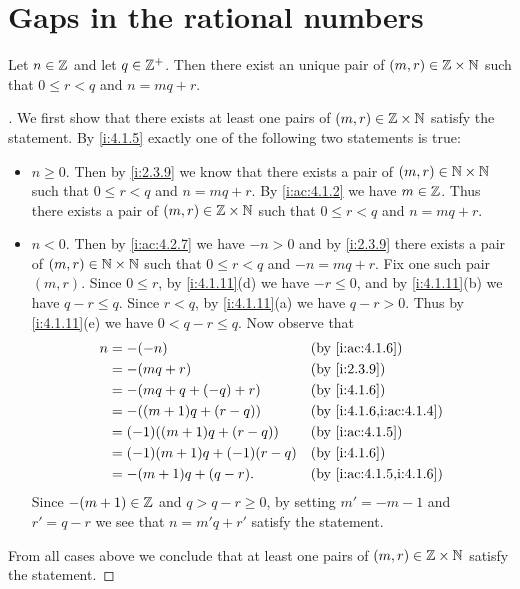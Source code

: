 \section{Gaps in the rational numbers}\label{i:sec:4.4}

\begin{ac}\label{i:ac:4.4.1}
  Let \(n \in \mathbb{Z}\) and let \(q \in \mathbb{Z}^+\).
  Then there exist an unique pair of \((m, r) \in \mathbb{Z} \times \mathbb{N}\) such that \(0 \leq r < q\) and \(n = mq + r\).
\end{ac}

\begin{proof}[]
  We first show that there exists at least one pairs of \((m, r) \in \mathbb{Z} \times \mathbb{N}\) satisfy the statement.
  By \cref{i:4.1.5} exactly one of the following two statements is true:
  \begin{itemize}
    \item \(n \geq 0\).
          Then by \cref{i:2.3.9} we know that there exists a pair of \((m, r) \in \mathbb{N} \times \mathbb{N}\) such that \(0 \leq r < q\) and \(n = mq + r\).
          By \cref{i:ac:4.1.2} we have \(m \in \mathbb{Z}\).
          Thus there exists a pair of \((m, r) \in \mathbb{Z} \times \mathbb{N}\) such that \(0 \leq r < q\) and \(n = mq + r\).
    \item \(n < 0\).
          Then by \cref{i:ac:4.2.7} we have \(-n > 0\) and by \cref{i:2.3.9} there exists a pair of \((m, r) \in \mathbb{N} \times \mathbb{N}\) such that \(0 \leq r < q\) and \(-n = mq + r\).
          Fix one such pair \((m, r)\).
          Since \(0 \leq r\), by \cref{i:4.1.11}(d) we have \(-r \leq 0\), and by \cref{i:4.1.11}(b) we have \(q - r \leq q\).
          Since \(r < q\), by \cref{i:4.1.11}(a) we have \(q - r > 0\).
          Thus by \cref{i:4.1.11}(e) we have \(0 < q - r \leq q\).
          Now observe that
          \begin{align*}
            n & = -(-n)                         &  & \by{i:ac:4.1.6}         \\
              & = -(mq + r)                     &  & \by{i:2.3.9}            \\
              & = -(mq + q + (-q) + r)          &  & \by{i:4.1.6}            \\
              & = -((m + 1) q + (r - q))        &  & \by{i:4.1.6,i:ac:4.1.4} \\
              & = (-1) ((m + 1) q + (r - q))    &  & \by{i:ac:4.1.5}         \\
              & = (-1) (m + 1) q + (-1) (r - q) &  & \by{i:4.1.6}            \\
              & = -(m + 1) q + (q - r).         &  & \by{i:ac:4.1.5,i:4.1.6}
          \end{align*}
          Since \(-(m + 1) \in \mathbb{Z}\) and \(q > q - r \geq 0\), by setting \(m' = -m - 1\) and \(r' = q - r\) we see that \(n = m'q + r'\) satisfy the statement.
  \end{itemize}
  From all cases above we conclude that at least one pairs of \((m, r) \in \mathbb{Z} \times \mathbb{N}\) satisfy the statement.


\end{proof}
